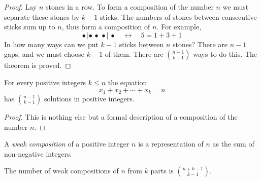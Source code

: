 \begin{page}

\begin{proof}
Lay $n$ stones in a row.
To form a composition of the number $n$ we must separate these stones by $k-1$ sticks.
The numbers of stones between consecutive sticks sum up to $n$, thus form a composition of $n$.
For example,
\[
\bullet\, | \bullet\, \bullet\, \bullet |\, \bullet \quad \longleftrightarrow \quad 5 = 1+3+1
\]
In how many ways can we put $k-1$ sticks between $n$ stones?
There are $n-1$ gaps, and we must choose $k-1$ of them.
There are $\binom{n-1}{k-1}$ ways to do this. The theorem is proved.
\end{proof}


\end{page}

\begin{page}

\begin{cor}
For every positive integers $k \le n$ the equation
\[
x_1 + x_2 + \cdots + x_k = n
\]
has $\binom{n-1}{k-1}$ solutions in positive integers.
\end{cor}

\end{page}

\begin{page}

\begin{proof}
This is nothing else but a formal description of a composition of the number $n$.
\end{proof}


\end{page}

\begin{page}

\begin{dfn}
A \emph{weak composition} of a positive integer $n$ is a representation of $n$ as the sum of non-negative integers.
\end{dfn}

\end{page}

\begin{page}

\begin{thm}
\label{thm:WeakComp}
The number of weak compositions of $n$ from $k$ parts is $\binom{n+k-1}{k-1}$.
\end{thm}

\end{page}

